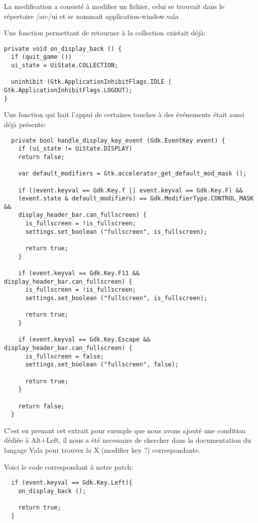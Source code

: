 \documentclass[12pt]{report}
\begin{document}
La modification a consisté à modifier un fichier, celui se trouvait
dans le répertoire /src/ui et se nommait application-window.vala .

Une fonction permettant de retourner à la collection existait déjà:

\begin{verbatim}
private void on_display_back () {
  if (quit_game ())
  ui_state = UiState.COLLECTION;

  uninhibit (Gtk.ApplicationInhibitFlags.IDLE | Gtk.ApplicationInhibitFlags.LOGOUT);
}
\end{verbatim}

Une fonction qui liait l'appui de certaines touches à des événements
était aussi déjà présente:

\begin{verbatim}
  private bool handle_display_key_event (Gdk.EventKey event) {
    if (ui_state != UiState.DISPLAY)
    return false;

    var default_modifiers = Gtk.accelerator_get_default_mod_mask ();

    if ((event.keyval == Gdk.Key.f || event.keyval == Gdk.Key.F) &&
    (event.state & default_modifiers) == Gdk.ModifierType.CONTROL_MASK &&
    display_header_bar.can_fullscreen) {
      is_fullscreen = !is_fullscreen;
      settings.set_boolean ("fullscreen", is_fullscreen);

      return true;
    }

    if (event.keyval == Gdk.Key.F11 && display_header_bar.can_fullscreen) {
      is_fullscreen = !is_fullscreen;
      settings.set_boolean ("fullscreen", is_fullscreen);

      return true;
    }

    if (event.keyval == Gdk.Key.Escape && display_header_bar.can_fullscreen) {
      is_fullscreen = false;
      settings.set_boolean ("fullscreen", false);

      return true;
    }
    
    return false;
  }
\end{verbatim}

C'est en prenant cet extrait pour exemple que nous avons ajouté une
condition dédiée à Alt+Left, il nous a été necessaire de chercher dans
la documentation du langage Vala pour trouver la X (modifier key ?)
correspondante.

Voici le code correspondant à notre patch:

\begin{verbatim}
  if (event.keyval == Gdk.Key.Left){			
    on_display_back ();
    
    return true;
  }
\end{verbatim}
\end{document}
